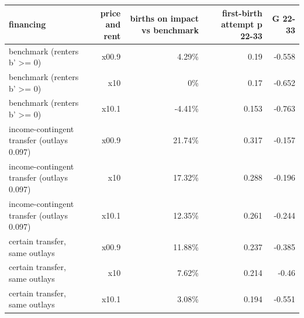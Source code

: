 \begin{tabular}{lrrrr}
\toprule
financing & price and rent & births on impact vs benchmark & first-birth attempt p 22-33 & G 22-33 \\
\midrule
benchmark (renters b' >= 0) & x00.9 & 4.29\% & 0.19 & -0.558 \\
benchmark (renters b' >= 0) & x10 & 0\% & 0.17 & -0.652 \\
benchmark (renters b' >= 0) & x10.1 & -4.41\% & 0.153 & -0.763 \\
income-contingent transfer (outlays 0.097) & x00.9 & 21.74\% & 0.317 & -0.157 \\
income-contingent transfer (outlays 0.097) & x10 & 17.32\% & 0.288 & -0.196 \\
income-contingent transfer (outlays 0.097) & x10.1 & 12.35\% & 0.261 & -0.244 \\
certain transfer, same outlays & x00.9 & 11.88\% & 0.237 & -0.385 \\
certain transfer, same outlays & x10 & 7.62\% & 0.214 & -0.46 \\
certain transfer, same outlays & x10.1 & 3.08\% & 0.194 & -0.551 \\
\bottomrule
\end{tabular}

